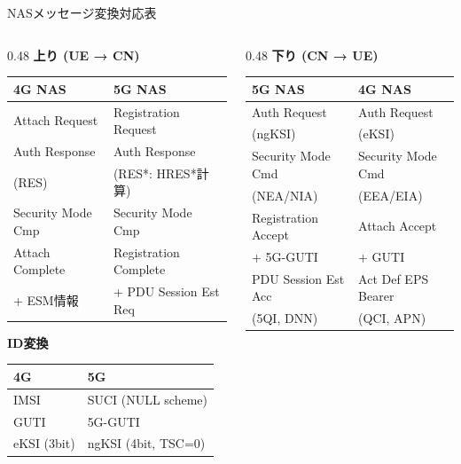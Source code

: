 \documentclass[dvipdfmx,11pt,aspectratio=169]{beamer}
\begin{document}
\begin{frame}{NASメッセージ変換対応表}
  \begin{columns}[T]
    \begin{column}{0.48\textwidth}
      \textbf{上り (UE → CN)}
      \begin{table}
        \tiny
        \begin{tabular}{|l|l|}
          \hline
          \textbf{4G NAS} & \textbf{5G NAS} \\
          \hline
          Attach Request & Registration Request \\
          \hline
          Auth Response & Auth Response \\
          (RES) & (RES*: HRES*計算) \\
          \hline
          Security Mode Cmp & Security Mode Cmp \\
          \hline
          Attach Complete & Registration Complete \\
          + ESM情報 & + PDU Session Est Req \\
          \hline
        \end{tabular}
      \end{table}

      \vspace{0.3cm}
      \textbf{ID変換}
      \begin{table}
        \tiny
        \begin{tabular}{|l|l|}
          \hline
          \textbf{4G} & \textbf{5G} \\
          \hline
          IMSI & SUCI (NULL scheme) \\
          \hline
          GUTI & 5G-GUTI \\
          \hline
          eKSI (3bit) & ngKSI (4bit, TSC=0) \\
          \hline
        \end{tabular}
      \end{table}
    \end{column}
    \begin{column}{0.48\textwidth}
      \textbf{下り (CN → UE)}
      \begin{table}
        \tiny
        \begin{tabular}{|l|l|}
          \hline
          \textbf{5G NAS} & \textbf{4G NAS} \\
          \hline
          Auth Request & Auth Request \\
          (ngKSI) & (eKSI) \\
          \hline
          Security Mode Cmd & Security Mode Cmd \\
          (NEA/NIA) & (EEA/EIA) \\
          \hline
          Registration Accept & Attach Accept \\
          + 5G-GUTI & + GUTI \\
          \hline
          PDU Session Est Acc & Act Def EPS Bearer \\
          (5QI, DNN) & (QCI, APN) \\
          \hline
        \end{tabular}
      \end{table}


\end{column}
\end{columns}
\end{frame}
\end{document}
